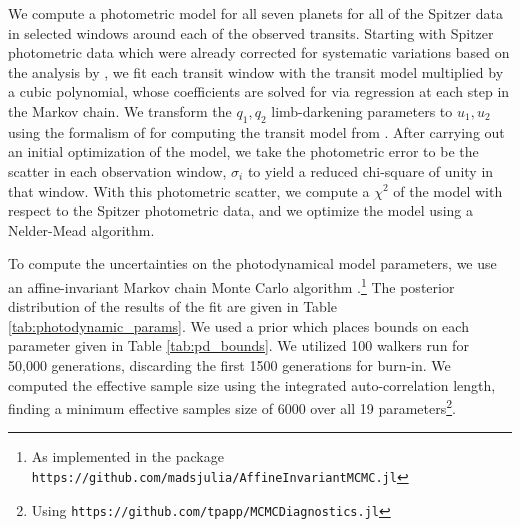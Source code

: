 \documentclass[twocolumn]{aastex63}
\begin{document}
We compute a photometric model for all seven
planets for all of the Spitzer data in selected windows around each of the observed
transits.  Starting with Spitzer photometric data which were already corrected for systematic
variations based on the analysis by \citet{Ducrot2020}, we fit  each transit window
with the transit model multiplied by a cubic polynomial, whose coefficients are solved
for via regression at each step in the Markov chain.  
We 
transform the $q_1, q_2$ limb-darkening 
parameters to $u_1,u_2$ using the formalism of \citet{Kipping2013} for computing the transit model from \citet{Agol2019}.  After carrying out an initial
optimization of the model, we take the photometric error to be the
scatter in each observation window, $\sigma_i$ to yield a reduced chi-square of unity in 
that  window.  With this photometric
scatter, we compute a $\chi^2$ of the model with respect to the Spitzer
photometric data, and we optimize the model using a Nelder-Mead algorithm.

To compute the uncertainties on the photodynamical model parameters, we
use an affine-invariant Markov chain Monte Carlo algorithm \citep{Goodman2010}.\footnote{As
implemented in the package \texttt{https://github.com/madsjulia/AffineInvariantMCMC.jl}}
The posterior distribution of the results of the fit are given in Table \ref{tab:photodynamic_params}.
We used a prior which places bounds on
each parameter given in 
Table \ref{tab:pd_bounds}.
We utilized 100 walkers run for 50,000 generations, discarding the first 1500 generations 
for burn-in.  We computed the effective sample size using the integrated
auto-correlation length, finding a minimum effective samples size of 6000 over all 
19 parameters\footnote{Using \texttt{https://github.com/tpapp/MCMCDiagnostics.jl}}.
\end{document}
